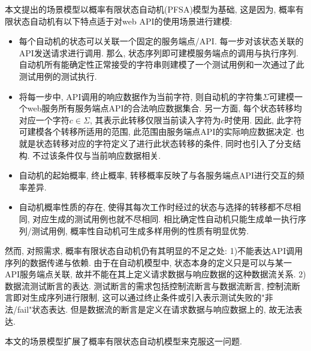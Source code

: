         本文提出的场景模型以概率有限状态自动机(PFSA)模型为基础, 这是因为, 概率有限状态自动机有以下特点适于对web API的使用场景进行建模:
        \begin{itemize}
            \item 每个自动机的状态可以关联一个固定的服务端点/API. 每一步对该状态关联的API发送请求进行调用. 那么, 状态序列即可建模服务端点的调用与执行序列. 自动机所有能确定性正常接受的字符串则建模了一个测试用例和一次通过了此测试用例的测试执行.
            
            \item 将每一步中, API调用的响应数据作为当前字符, 则自动机的字符集$\Sigma$可建模一个web服务所有服务端点API的合法响应数据集合. 另一方面, 每个状态转移均对应一个字符$c \in \Sigma$, 其表示此转移仅限当前读入字符为$c$时使用. 因此, 此字符可建模各个转移所适用的范围, 此范围由服务端点API的实际响应数据决定. 也就是状态转移对应的字符定义了进行此状态转移的条件, 同时也引入了分支结构. 不过该条件仅与当前响应数据相关.
            
            \item 自动机的起始概率, 终止概率, 转移概率反映了与各服务端点API进行交互的频率差异.
            
            \item 自动机概率性质的存在, 使得其每次工作时经过的状态与选择的转移都不尽相同, 对应生成的测试用例也就不尽相同. 相比确定性自动机只能生成单一执行序列/测试用例, 概率性自动机可生成多样用例的性质有明显优势.
        \end{itemize}
        
        然而, 对照需求, 概率有限状态自动机仍有其明显的不足之处: 1)不能表达API调用序列的数据传递与依赖. 由于在自动机模型中, 状态本身的定义只是可以与某一API服务端点关联, 故并不能在其上定义请求数据与响应数据的这种数据流关系. 2)数据流测试断言的表达. 测试断言的需求包括控制流断言与数据流断言, 控制流断言即对生成序列进行限制, 这可以通过终止条件或引入表示测试失败的"非法/fail"状态表达. 但是数据流的断言是定义在请求数据与响应数据上的, 故无法表达.

        本文的场景模型扩展了概率有限状态自动机模型来克服这一问题.
    

